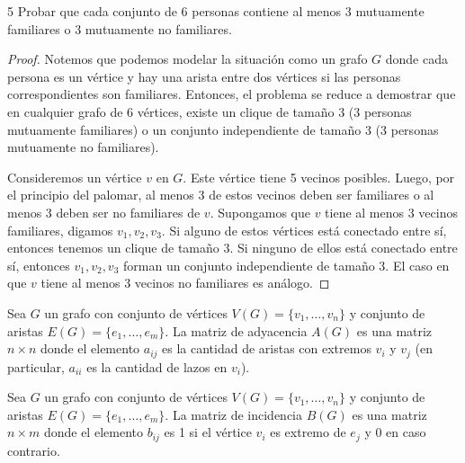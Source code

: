 \begin{ejercicioEntregar}{5}
    Probar que cada conjunto de 6 personas contiene al menos 3 mutuamente familiares o 3 mutuamente no familiares.
\end{ejercicioEntregar}
\begin{proof}
    Notemos que podemos modelar la situación como un grafo \( G \) donde cada persona es un vértice y hay una arista entre dos vértices si las personas correspondientes son familiares. Entonces, el problema se reduce a demostrar que en cualquier grafo de 6 vértices, existe un clique de tamaño 3 (3 personas mutuamente familiares) o un conjunto independiente de tamaño 3 (3 personas mutuamente no familiares).

    Consideremos un vértice \( v \) en \( G \). Este vértice tiene 5 vecinos posibles. Luego, por el principio del palomar, al menos 3 de estos vecinos deben ser familiares o al menos 3 deben ser no familiares de \( v \). Supongamos que \( v \) tiene al menos 3 vecinos familiares, digamos \( v_1, v_2, v_3 \). Si alguno de estos vértices está conectado entre sí, entonces tenemos un clique de tamaño 3. Si ninguno de ellos está conectado entre sí, entonces \( v_1, v_2, v_3 \) forman un conjunto independiente de tamaño 3. El caso en que \( v \) tiene al menos 3 vecinos no familiares es análogo.
\end{proof}

\vspace{0.5cm}

\begin{definition}
    Sea \( G \) un grafo con conjunto de vértices \( V(G) = \{ v_1, \ldots, v_n \} \) y conjunto de aristas \( E(G) = \{ e_1, \ldots, e_m \} \). La matriz de adyacencia \( A(G) \) es una matriz \( n \times n \) donde el elemento \( a_{ij} \) es la cantidad de aristas con extremos \( v_i \) y \( v_j \) (en particular, \( a_{ii} \) es la cantidad de lazos en \( v_i \)).
\end{definition}

\begin{definition}
    Sea \( G \) un grafo con conjunto de vértices \( V(G) = \{ v_1, \ldots, v_n \} \) y conjunto de aristas \( E(G) = \{ e_1, \ldots, e_m \} \). La matriz de incidencia \( B(G) \) es una matriz \( n \times m \) donde el elemento \( b_{ij} \) es 1 si el vértice \( v_i \) es extremo de \( e_j \) y 0 en caso contrario.
\end{definition}

